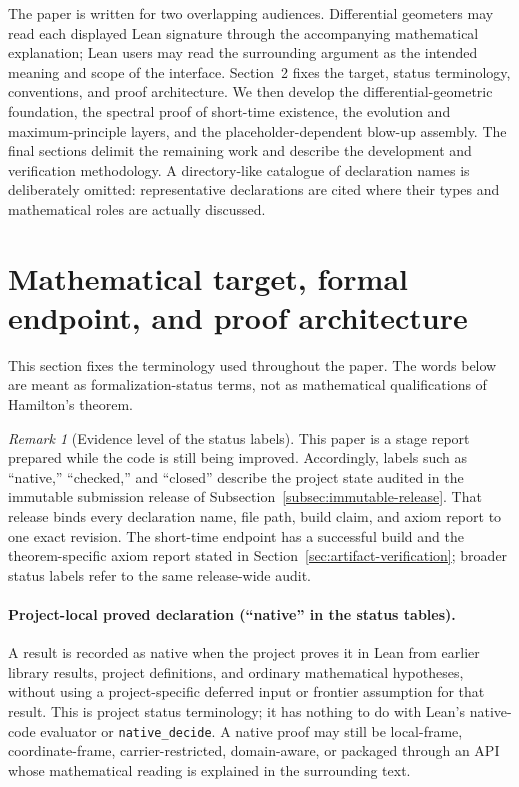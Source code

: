 \documentclass[11pt]{article}
\theoremstyle{plain}
\theoremstyle{definition}
\theoremstyle{remark}
\newtheorem{remark}[theorem]{Remark}
\begin{document}
The paper is written for two overlapping audiences.  Differential geometers
may read each displayed Lean signature through the accompanying mathematical
explanation; Lean users may read the surrounding argument as the intended
meaning and scope of the interface.  Section~2 fixes the target, status
terminology, conventions, and proof architecture.  We then develop the
differential-geometric foundation, the spectral proof of short-time existence,
the evolution and maximum-principle layers, and the placeholder-dependent
blow-up assembly.  The final sections delimit the remaining work and describe
the development and verification methodology.  A directory-like catalogue of
declaration names is deliberately omitted: representative declarations are
cited where their types and mathematical roles are actually discussed.

\section{Mathematical target, formal endpoint, and proof architecture}

This section fixes the terminology used throughout the paper.  The words below
are meant as formalization-status terms, not as mathematical qualifications of
Hamilton's theorem.

\begin{remark}[Evidence level of the status labels]
\label{rem:status-evidence}
This paper is a stage report prepared while the code is still being improved.
Accordingly, labels such as ``native,'' ``checked,'' and ``closed'' describe
the project state audited in the immutable submission release of
Subsection~\ref{subsec:immutable-release}.  That release binds every declaration
name, file path, build claim, and axiom report to one exact revision.  The
short-time endpoint has a successful build and the theorem-specific axiom
report stated in Section~\ref{sec:artifact-verification}; broader status labels
refer to the same release-wide audit.
\end{remark}

\paragraph{Project-local proved declaration (``native'' in the status tables).}
A result is recorded as native when the project proves it in Lean from earlier
library results, project definitions, and ordinary mathematical hypotheses,
without using a project-specific deferred input or frontier assumption for that
result.  This is project status terminology; it has nothing to do with Lean's
native-code evaluator or \texttt{native\_decide}.  A native proof may still be local-frame, coordinate-frame,
carrier-restricted, domain-aware, or packaged through an API whose mathematical
reading is explained in the surrounding text.
\end{document}
